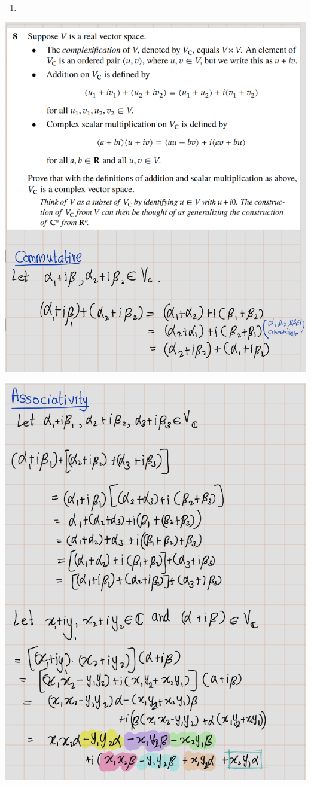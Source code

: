 \documentclass[
]{book}
\providecommand{\tightlist}{%
  \setlength{\itemsep}{0pt}\setlength{\parskip}{0pt}}
\theoremstyle{definition}
\theoremstyle{definition}
\theoremstyle{definition}
\theoremstyle{definition}
\theoremstyle{remark}
\begin{document}
\begin{enumerate}
\def\labelenumi{\arabic{enumi}.}
\setcounter{enumi}{7}
\tightlist
\item
\end{enumerate}

\includegraphics{fig/Ex1B/Ex8-1.png}

\includegraphics{fig/Ex1B/Ex8-2.png}
\end{document}
